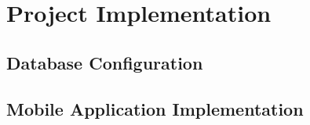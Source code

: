 \chapter{Project Implementation}
\section{Database Configuration}
\section{Mobile Application Implementation}
